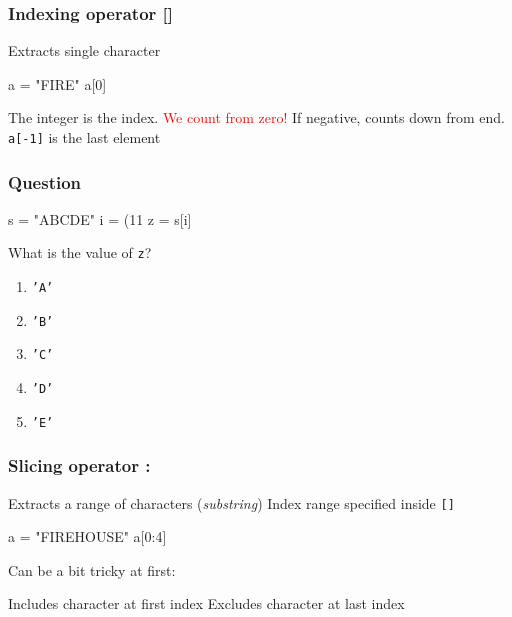 \documentclass[11pt]{beamer}
\begin{document}
\begin{frame}[fragile]
  \frametitle{Indexing operator \textbf{[]}}
  \Enlarge

  \begin{itemize}
  \myitem  Extracts single character
\begin{semiverbatim}
a = "FIRE"
a[0]
\end{semiverbatim} \pause
  \myitem  The integer is the index. \pause
  \myitem  \textcolor{red}{We count from zero!} \pause
  \myitem  If negative, counts down from end. \pause
  \myitem \texttt{a[-1]} is the last element
  \end{itemize}
\end{frame}

\begin{frame}[fragile]
  \frametitle{Question}
  \Enlarge

  \begin{semiverbatim}
s = "ABCDE"
i = (11 %
z = s[i]
  \end{semiverbatim}

  What is the value of \texttt{z}?
  \begin{enumerate}[label=\Alph*]
  \item  \texttt{'A'}
  \item  \texttt{'B'}
  \item  \texttt{'C'}
  \item  \texttt{'D'}
  \item  \texttt{'E'}
  \end{enumerate}
\end{frame}

\begin{frame}[fragile]
  \frametitle{Slicing operator \textbf{:}}
  \Enlarge

  \begin{itemize}
  \myitem  Extracts a range of characters (\emph{substring}) 
  \myitem  Index range specified inside \texttt{[]}
\begin{semiverbatim}
a = "FIREHOUSE"
a[0:4]
\end{semiverbatim} \pause
  \myitem  Can be a bit tricky at first:
    \begin{itemize}
    \mysubitem  Includes character at first index
    \mysubitem  Excludes character at last index
    \end{itemize}
  \end{itemize}
\end{frame}
\end{document}
